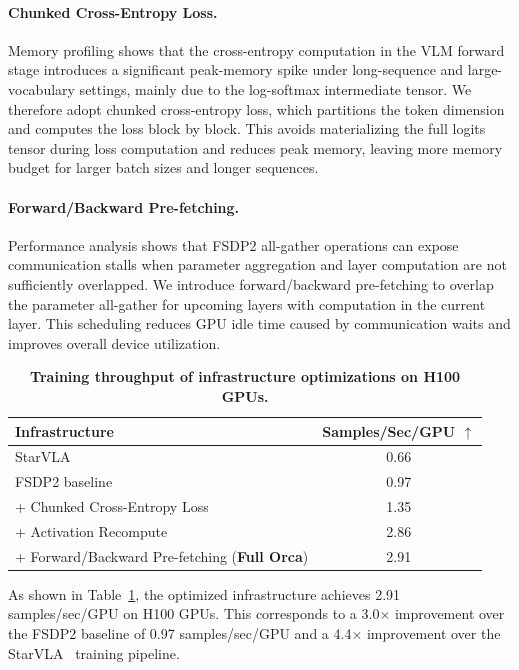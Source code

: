 \paragraph{Chunked Cross-Entropy Loss.} 
Memory profiling shows that the cross-entropy computation in the VLM forward stage introduces a significant peak-memory spike under long-sequence and large-vocabulary settings, mainly due to the log-softmax intermediate tensor. We therefore adopt chunked cross-entropy loss, which partitions the token dimension and computes the loss block by block. This avoids materializing the full logits tensor during loss computation and reduces peak memory, leaving more memory budget for larger batch sizes and longer sequences.


\paragraph{Forward/Backward Pre-fetching.} 
Performance analysis shows that FSDP2 all-gather operations can expose communication stalls when parameter aggregation and layer computation are not sufficiently overlapped. We introduce forward/backward pre-fetching to overlap the parameter all-gather for upcoming layers with computation in the current layer. This scheduling reduces GPU idle time caused by communication waits and improves overall device utilization.


\begin{table}[!htbp]
    \centering
    \caption{\textbf{Training throughput of infrastructure optimizations on H100 GPUs.}}
    \label{tab:appendix_infra_comparison}
    \begin{tabular}{lc}
    \toprule[1pt]
    \textbf{Infrastructure} & \textbf{Samples/Sec/GPU $\uparrow$} \\
    \midrule[0.5pt]
    StarVLA~\citep{StarVLA} & 0.66 \\
    FSDP2 baseline & 0.97 \\
    \midrule[0.5pt]
    + Chunked Cross-Entropy Loss & 1.35 \\
    + Activation Recompute & 2.86 \\
    + Forward/Backward Pre-fetching (\textbf{Full Orca}) & 2.91 \\
    \bottomrule[1pt]
    \end{tabular}
\end{table}

As shown in Table~\ref{tab:appendix_infra_comparison}, the optimized infrastructure achieves 2.91 samples/sec/GPU on H100 GPUs. This corresponds to a 3.0$\times$ improvement over the FSDP2 baseline of 0.97 samples/sec/GPU and a 4.4$\times$ improvement over the StarVLA~\citep{StarVLA} training pipeline.